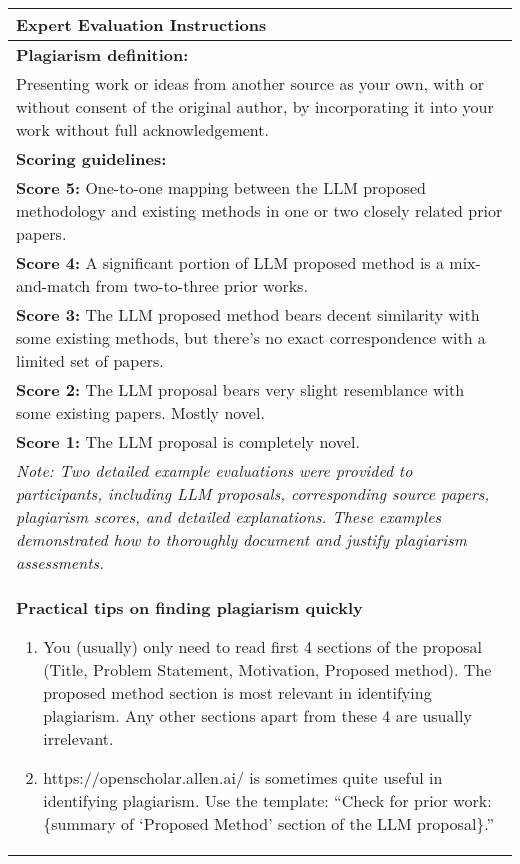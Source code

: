 \begin{table*}[t]
    \centering
    \small
    \renewcommand{\arraystretch}{1.4}
    \begin{tabular}{|p{}|}
        \hline
        \textbf{Expert Evaluation Instructions} \\
        \hline
        \textbf{Plagiarism definition:} \\
        Presenting work or ideas from another source as your own, with or without consent of the original author, by incorporating it into your work without full acknowledgement. \\
        \midrule
        \textbf{Scoring guidelines:} \\
        \textbf{Score 5:} One-to-one mapping between the LLM proposed methodology and existing methods in one or two closely related prior papers. \\[0.5ex]
        \textbf{Score 4:} A significant portion of LLM proposed method is a mix-and-match from two-to-three prior works. \\[0.5ex]
        \textbf{Score 3:} The LLM proposed method bears decent similarity with some existing methods, but there's no exact correspondence with a limited set of papers. \\[0.5ex]
        \textbf{Score 2:} The LLM proposal bears very slight resemblance with some existing papers. Mostly novel. \\[0.5ex]
        \textbf{Score 1:} The LLM proposal is completely novel. \\[1ex]
        \textit{Note: Two detailed example evaluations were provided to participants, including LLM proposals, corresponding source papers, plagiarism scores, and detailed explanations. These examples demonstrated how to thoroughly document and justify plagiarism assessments.} \\
        \midrule
        \textbf{Practical tips on finding plagiarism quickly}
        \begin{enumerate}
            \item You (usually) only need to read first 4 sections of the proposal (Title, Problem Statement, Motivation, Proposed method). The proposed method section is most relevant in identifying plagiarism. Any other sections apart from these 4 are usually irrelevant.
            \item https://openscholar.allen.ai/ is sometimes quite useful in identifying plagiarism. Use the template: ``Check for prior work: \{summary of `Proposed Method' section of the LLM proposal\}.''

\end{enumerate}
\end{tabular}
\end{table*}
